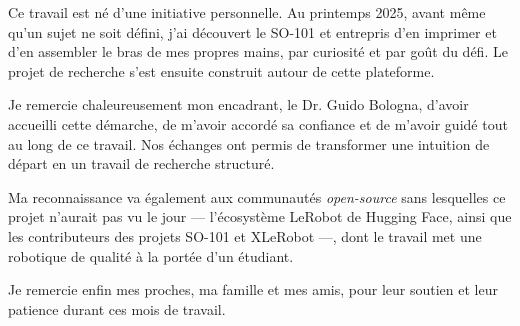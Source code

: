 Ce travail est né d'une initiative personnelle. Au printemps 2025, avant même qu'un sujet ne soit défini, j'ai découvert le SO-101 et entrepris d'en imprimer et d'en assembler le bras de mes propres mains, par curiosité et par goût du défi. Le projet de recherche s'est ensuite construit autour de cette plateforme.

Je remercie chaleureusement mon encadrant, le Dr. Guido Bologna, d'avoir accueilli cette démarche, de m'avoir accordé sa confiance et de m'avoir guidé tout au long de ce travail. Nos échanges ont permis de transformer une intuition de départ en un travail de recherche structuré.

Ma reconnaissance va également aux communautés \emph{open-source} sans lesquelles ce projet n'aurait pas vu le jour --- l'écosystème LeRobot de Hugging Face, ainsi que les contributeurs des projets SO-101 et XLeRobot ---, dont le travail met une robotique de qualité à la portée d'un étudiant.

Je remercie enfin mes proches, ma famille et mes amis, pour leur soutien et leur patience durant ces mois de travail.

